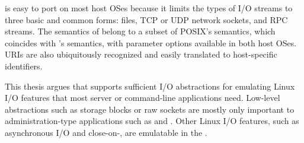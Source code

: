 



 is easy to port on most host OSes because it limits the types of I/O streams
to three basic and common forms: files, TCP or UDP network sockets, and RPC streams.
The semantics of  belong to a subset of POSIX's  semantics, which coincides with \win{}'s  semantics, with parameter options available in both host OSes.
URIs are also ubiquitously recognized and easily translated
to host-specific identifiers.

This thesis argues that  supports sufficient I/O abstractions
for emulating Linux I/O features that most server or command-line applications need.
Low-level abstractions such as storage blocks or raw sockets are mostly only important to administration-type applications such as  and .
Other Linux I/O features, such as asynchronous I/O and close-on-,
are emulatable in the \libos{}.




